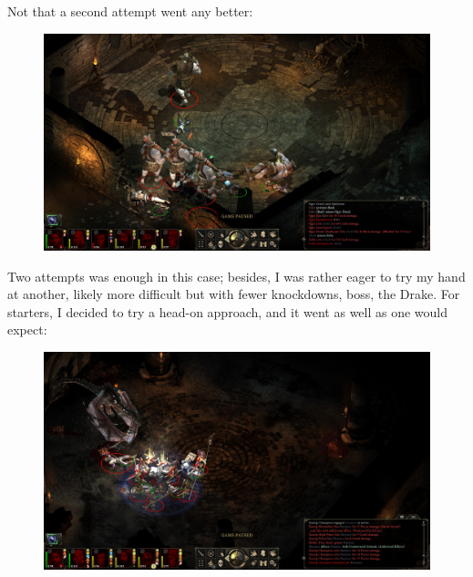 \documentclass{article}
\begin{document}
Not that a second attempt went any better:

\begin{figure}
\includegraphics[scale=0.33]{files/blog/2018_06_16_pillars_of_eternity_path_of_the_damned_act_i/2018_06_16_zolla_r2_wipe2.jpg}
\end{figure}

Two attempts was enough in this case; besides, I was rather eager to try my hand at another, likely more difficult but with fewer knockdowns, boss, the Drake.  For starters, I decided to try a head-on approach, and it went as well as one would expect:

\begin{figure}
\includegraphics[scale=0.33]{files/blog/2018_06_16_pillars_of_eternity_path_of_the_damned_act_i/2018_06_16_drake.jpg}
\end{figure}
\end{document}
